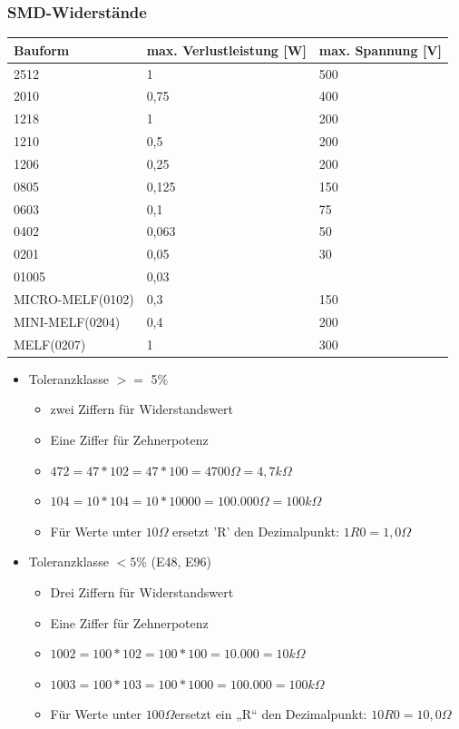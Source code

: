 \subsubsection{SMD-Widerstände}
\begin{longtable}{|l|l|l|}
\hline
\textbf{Bauform}&\textbf{max. Verlustleistung [W]}&\textbf{max. Spannung [V]}\\
\hline
\hline
2512&1&500\\
\hline
2010&0,75&400\\
\hline
1218&1&200\\
\hline
1210&0,5&200\\
\hline
1206&0,25&200\\
\hline
0805&0,125&150\\
\hline
0603&0,1&75\\
\hline
0402&0,063&50\\
\hline
0201&0,05&30\\
\hline
01005&0,03&\\
\hline
MICRO-MELF(0102)&0,3&150\\
\hline
MINI-MELF(0204)&0,4&200\\
\hline
MELF(0207)&1&300\\
\hline
\end{longtable}

\begin{itemize}
  \item Toleranzklasse $>=$ 5\%
  \begin{itemize}
    \item zwei Ziffern für Widerstandswert
    \item Eine Ziffer für Zehnerpotenz
    \item $472=47*102 =47*100=4700\Omega=4,7k\Omega$
    \item $104=10*104 =10*10000=100.000\Omega=100k\Omega$
    \item Für Werte unter $10 \Omega$ ersetzt 'R' den Dezimalpunkt: $1R0 =
    1,0\Omega$
   \end{itemize}
   \item Toleranzklasse $< 5$\% (E48, E96)
   \begin{itemize}
     \item Drei Ziffern für Widerstandswert
     \item Eine Ziffer für Zehnerpotenz
     \item $1002=100*102 =100*100=10.000=10k\Omega$
     \item $1003=100*103 =100*1000=100.000=100k\Omega$
     \item Für Werte unter $100\Omega$ersetzt ein „R“ den Dezimalpunkt: $10R0 =
     10,0\Omega$
    \end{itemize}
\end{itemize}


